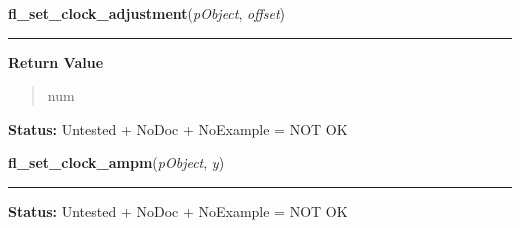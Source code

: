 \hspace{.8\funcindent}\begin{boxedminipage}{\funcwidth}

    \raggedright \textbf{fl\_set\_clock\_adjustment}(\textit{pObject}, \textit{offset})

    \vspace{-1.5ex}

    \rule{\textwidth}{0.5\fboxrule}
\setlength{\parskip}{2ex}
\setlength{\parskip}{1ex}
      \textbf{Return Value}
    \vspace{-1ex}

      \begin{quote}
      num

      \end{quote}

\textbf{Status:} Untested + NoDoc + NoExample = NOT OK



    \end{boxedminipage}

    \label{xformslib:library:fl_set_clock_ampm}

    \vspace{0.5ex}

\hspace{.8\funcindent}\begin{boxedminipage}{\funcwidth}

    \raggedright \textbf{fl\_set\_clock\_ampm}(\textit{pObject}, \textit{y})

    \vspace{-1.5ex}

    \rule{\textwidth}{0.5\fboxrule}
\setlength{\parskip}{2ex}
\setlength{\parskip}{1ex}
\textbf{Status:} Untested + NoDoc + NoExample = NOT OK



    \end{boxedminipage}

    \label{xformslib:library:fl_create_counter}

    \vspace{0.5ex}

